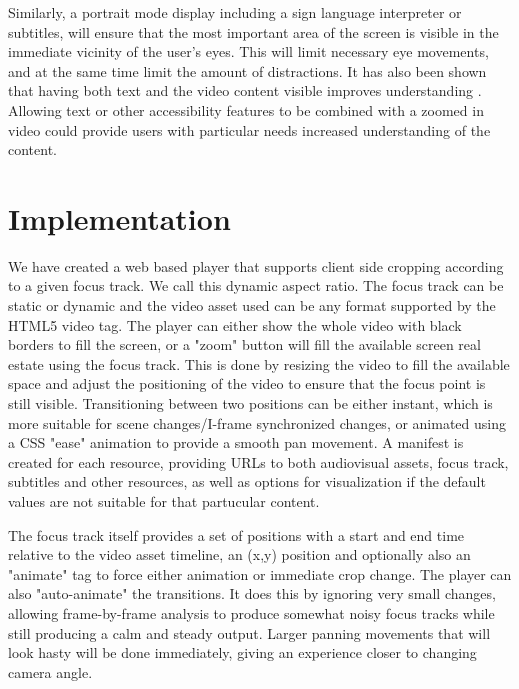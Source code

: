 \documentclass[sigconf, review=false]{acmart}
\begin{document}
Similarly, a portrait mode display including a sign language interpreter or
subtitles, will ensure that the most important area of the screen is visible
in the immediate vicinity of the user's eyes. This will limit necessary eye
movements, and at the same time limit the amount of distractions. It has also
been shown that having both text and the video content visible improves
understanding \cite{eyetracking}. Allowing text or other accessibility
features to be combined with a zoomed in video could provide users with
particular needs increased understanding of the content.



\section{Implementation}

We have created a web based player that supports client side cropping
according to a given focus track. We call this dynamic aspect ratio. The
focus track can be static or dynamic and the video asset used can be any
format supported by the HTML5 video tag. The player can either show the whole
video with black borders to fill the screen, or a "zoom" button will fill the
available screen real estate using the focus track. This is done by resizing
the video to fill the available space and adjust the positioning of the video
to ensure that the focus point is still visible. Transitioning between two
positions can be either instant, which is more suitable for scene
changes/I-frame synchronized changes, or animated using a CSS "ease"
animation to provide a smooth pan movement. A manifest is created for each
resource, providing URLs to both audiovisual assets, focus track, subtitles
and other resources, as well as options for visualization if the default
values are not suitable for that partucular content.

The focus track itself provides a set of positions with a start and end time
relative to the video asset timeline, an (x,y) position and optionally also
an "animate" tag to force either animation or immediate crop change. The
player can also "auto-animate" the transitions. It does this by ignoring very
small changes, allowing frame-by-frame analysis to produce somewhat noisy
focus tracks while still producing a calm and steady output. Larger panning
movements that will look hasty will be done immediately, giving an experience
closer to changing camera angle.
\end{document}
